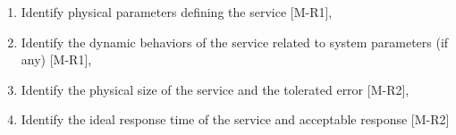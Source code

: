 \begin{enumerate}
  \item Identify physical parameters defining the service [M-R1],
  \item Identify the dynamic behaviors of the service related to system parameters (if any) [M-R1],
  \item Identify the physical size of the service and the tolerated error [M-R2], %
  \item Identify the ideal response time of the service and acceptable response [M-R2]

\end{enumerate}

